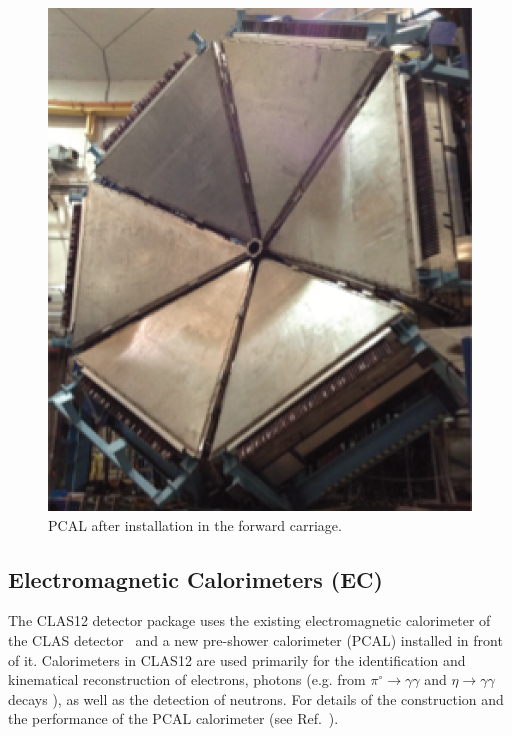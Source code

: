 \documentclass[final,3p,twocolumn]{elsarticle}
\begin{document}
\begin{figure}[htbp!]
\centerline{\includegraphics[width=0.95\columnwidth]{PCAL.png}}
\caption{PCAL after installation in the forward carriage. }
\label{ec-pcal}
\end{figure}
\subsection{\rm Electromagnetic Calorimeters (EC) }
The CLAS12 detector package uses the existing electromagnetic calorimeter of the CLAS 
detector~\cite{Amarian:2001zs} and a new pre-shower calorimeter (PCAL) installed in front of it. Calorimeters in 
CLAS12 are used primarily for the identification and kinematical reconstruction of electrons, photons 
(e.g. from $\pi^\circ \to \gamma \gamma$ and $\eta \to \gamma  \gamma$ decays ), as well as the detection of 
neutrons. For details of the construction and the performance of the PCAL calorimeter (see Ref.~\cite{PCAL}). 
\end{document}
